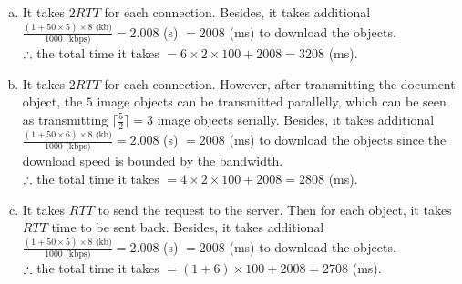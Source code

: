 \begin{pr}$ $
\begin{enumerate}[a.]
\item It takes $2RTT$ for each connection. Besides, it takes additional $\frac{(1+50\times5)\times8\text{ (kb)}}{1000\text{ (kbps)}}=2.008$ (s) $=2008$ (ms) to download the objects.\\
$\therefore$ the total time it takes $=6\times2\times100+2008=3208$ (ms).
\item It takes $2RTT$ for each connection. However, after transmitting the document object, the $5$ image objects can be transmitted parallelly, which can be seen as transmitting $\lceil\frac52\rceil=3$ image objects serially. Besides, it takes additional $\frac{(1+50\times6)\times8\text{ (kb)}}{1000\text{ (kbps)}}=2.008$ (s) $=2008$ (ms) to download the objects since the download speed is bounded by the bandwidth.\\
$\therefore$ the total time it takes $=4\times2\times100+2008=2808$ (ms).
\item It takes $RTT$ to send the request to the server. Then for each object, it takes $RTT$ time to be sent back. Besides, it takes additional $\frac{(1+50\times5)\times8\text{ (kb)}}{1000\text{ (kbps)}}=2.008$ (s) $=2008$ (ms) to download the objects.\\
$\therefore$ the total time it takes $=(1+6)\times100+2008=2708$ (ms).
\end{enumerate}
\end{pr}
